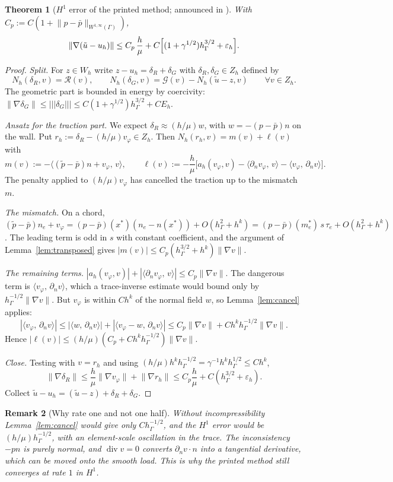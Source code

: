 \documentclass[pdflatex,sn-mathphys-num]{sn-jnl}
\theoremstyle{thmstyleone}
\newtheorem{theorem}{Theorem}[section]
\theoremstyle{thmstylethree}
\newtheorem{remark}[theorem]{Remark}
\newcommand{\hG}{h_\Gamma}
\newcommand{\Zh}{Z_h}
\newcommand{\Wh}{W_h}
\newcommand{\dn}{\partial_n}
\newcommand{\ut}{\tilde u}
\newcommand{\pt}{\tilde p}
\newcommand{\pbar}{\bar p}
\newcommand{\ip}[2]{\langle #1,\, #2\rangle}
\newcommand{\tnorm}[1]{|\!|\!|#1|\!|\!|}
\newcommand{\norm}[1]{\lVert #1\rVert}
\newcommand{\eps}{\varepsilon_h}
\renewcommand{\div}{\operatorname{div}}
\newcommand{\Rc}{\mathcal R}
\newcommand{\Gc}{\mathcal G}
\begin{document}
\begin{theorem}[$H^1$ error of the printed method; announced in {\cite{CavalcantePadhiLetter}}]\label{thm:C}
With $C_p:=C(1+\norm{p-\pbar}_{W^{1,\infty}(\Gamma)})$,
\[
\norm{\nabla(\ut-u_h)}\le C_p\,\frac h\mu+C\Bigl[(1+\gamma^{1/2})\hG^{3/2}+\eps\Bigr].
\]
\end{theorem}

\begin{proof}
\emph{Split.} For $z\in\Wh$ write $z-u_h=\delta_R+\delta_G$ with $\delta_R,\delta_G\in\Zh$ defined by
\[
N_h(\delta_R,v)=\Rc(v),\qquad N_h(\delta_G,v)=\Gc(v)-N_h(\ut-z,v)\qquad\forall v\in\Zh .
\]
The geometric part is bounded in energy by coercivity: $\norm{\nabla\delta_G}\le\tnorm{\delta_G}\le C(1+\gamma^{1/2})\hG^{3/2}+CE_h$.

\emph{Ansatz for the traction part.} We expect $\delta_R\approx(h/\mu)w$, with $w=-(p-\pbar)n$ on the wall. Put $r_h:=\delta_R-(h/\mu)v_\varphi\in\Zh$. Then $N_h(r_h,v)=m(v)+\ell(v)$ with
\[
m(v):=-\ip{(\pt-\pbar)n+v_\varphi}{v},\qquad
\ell(v):=-\frac h\mu\bigl[a_h(v_\varphi,v)-\ip{\dn v_\varphi}{v}-\ip{v_\varphi}{\dn v}\bigr].
\]
The penalty applied to $(h/\mu)v_\varphi$ has cancelled the traction up to the mismatch $m$.

\emph{The mismatch.} On a chord, $(\pt-\pbar)n_e+v_\varphi=(p-\pbar)(x^\ast)(n_e-n(x^\ast))+O(\hG^2+h^k)=(p-\pbar)(m_e^\ast)\,s\,\tau_e+O(\hG^2+h^k)$. The leading term is odd in $s$ with constant coefficient, and the argument of Lemma~\ref{lem:transposed} gives $|m(v)|\le C_p(\hG^{3/2}+h^k)\norm{\nabla v}$.

\emph{The remaining terms.} $|a_h(v_\varphi,v)|+|\ip{\dn v_\varphi}{v}|\le C_p\norm{\nabla v}$. The dangerous term is $\ip{v_\varphi}{\dn v}$, which a trace-inverse estimate would bound only by $\hG^{-1/2}\norm{\nabla v}$. But $v_\varphi$ is within $Ch^k$ of the normal field $w$, so Lemma~\ref{lem:cancel} applies:
\[
|\ip{v_\varphi}{\dn v}|\le|\ip{w}{\dn v}|+|\ip{v_\varphi-w}{\dn v}|\le C_p\norm{\nabla v}+Ch^k\hG^{-1/2}\norm{\nabla v}.
\]
Hence $|\ell(v)|\le(h/\mu)(C_p+Ch^k\hG^{-1/2})\norm{\nabla v}$.

\emph{Close.} Testing with $v=r_h$ and using $(h/\mu)h^k\hG^{-1/2}=\gamma^{-1}h^k\hG^{1/2}\le Ch^k$,
\[
\norm{\nabla\delta_R}\le\frac h\mu\norm{\nabla v_\varphi}+\norm{\nabla r_h}\le C_p\frac h\mu+C(\hG^{3/2}+\eps).
\]
Collect $\ut-u_h=(\ut-z)+\delta_R+\delta_G$.
\end{proof}

\begin{remark}[Why rate one and not one half]
Without incompressibility Lemma~\ref{lem:cancel} would give only $C\hG^{-1/2}$, and the $H^1$ error would be $(h/\mu)\hG^{-1/2}$, with an element-scale oscillation in the trace. The inconsistency $-pn$ is purely \emph{normal}, and $\div v=0$ converts $\dn v\cdot n$ into a tangential derivative, which can be moved onto the smooth load. This is why the printed method still converges at rate $1$ in $H^1$.
\end{remark}
\end{document}
